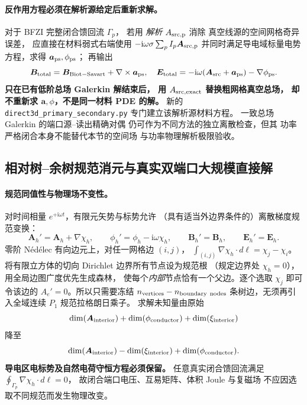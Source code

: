 \paragraph{反作用方程必须在解析源给定后重新求解。}
对于 BFZI 完整闭合馈回流 $\Gamma_p$，
若用 \emph{解析} $A_{\rm src,p}$ 消除
真空线源的空间网格奇异误差，
应直接在材料弱式右端使用
$-\mathrm i\omega\sigma\sum_pI_p\bm A_{\rm src,p}$
并同时满足导电域标量电势方程，求得
$\bm a_{\rm ps},\phi_{\rm ps}$；
再输出
\begin{equation}
 \bm B_{\rm total}=\bm B_{\rm Biot-Savart}
                         +\nabla\times\bm a_{\rm ps},
 \quad
 \bm E_{\rm total}=
  -\mathrm i\omega(\bm A_{\rm src}+\bm a_{\rm ps})
                           -\nabla\phi_{\rm ps}.
\end{equation}
\textbf{只在已有低阶总场 Galerkin 解结束后，
用 $A_{\rm src,exact}$ 替换粗网格真空总场，
却不重新求 $\bm a,\phi$，不是同一材料 PDE 的解。}
新的 \texttt{direct3d\_primary\_secondary.py}
专门建立该解析源材料方程。
一致总场 Galerkin 的端口源--读出精确对偶
仍可作为不同方法的独立离散检查，但其
功率严格闭合本身不能替代本节的空间场
与功率物理解析极限验收。


\subsection{相对树--余树规范消元与真实双端口大规模直接解}
\label{sec:bfzi-d2-relative-tree-gauge}

\paragraph{规范同值性与物理场不变性。}
对时间相量 $e^{+\mathrm i\omega t}$，有限元矢势与标势允许
（具有适当外边界条件的）离散梯度规范变换：
\begin{equation}
 \bm A_h'=\bm A_h+\nabla\chi_h,\qquad
 \phi_h'=\phi_h-\mathrm i\omega\chi_h,\qquad
 \bm B_h'=\bm B_h,\qquad
 \bm E_h'=\bm E_h.
\end{equation}
零阶 N\'ed\'elec 有向边元上，对任一网格边 $(i,j)$，
$\int_{(i,j)}\nabla\chi_h\cdot d\bm\ell
=\chi_j-\chi_i$。
将有限立方体的切向 Dirichlet 边界所有节点设为规范根
（规定边界处 $\chi_h=0$），用全局边图广度优先生成森林，
使每个\emph{内部}节点恰有一个父边。逐个选取 $\chi_j$
即可令该边的 $A_e'=0$。所以只需要冻结
$n_{\rm vertices}-n_{\rm boundary\ nodes}$
条树边，无须再引入全域连续 $P_1$ 规范拉格朗日乘子。
求解未知量由原始
\[
  \dim(\bm A_{\rm interior})+\dim(\phi_{\rm conductor})
       +\dim(\xi_{\rm interior})
\]
降至
\[
  \dim(\bm A_{\rm interior})-\dim(\xi_{\rm interior})
       +\dim(\phi_{\rm conductor}).
\]
\textbf{导电区电标势及自然电荷守恒方程必须保留。}
任意真实闭合馈回流满足
$\oint_{\Gamma_p}\nabla\chi_h\cdot d\bm\ell=0$，
故闭合端口电压、互易矩阵、体积 Joule 与复磁场
不应因选取不同规范而发生物理改变。


